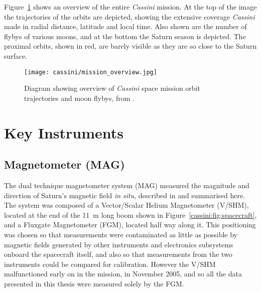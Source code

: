 Figure~\ref{cassini:fig:missionoverview} shows an overview of the entire \textit{Cassini} mission. At the top of the image the trajectories of the orbits are depicted, showing the extensive coverage \textit{Cassini} made in radial distance, latitude and local time. Also shown are the number of flybys of various moons, and  at the bottom the Saturn season is depicted. The proximal orbits, shown in red, are barely visible as they are so close to the Saturn surface.

\begin{figure}
\centering
\noindent\texttt{[image: cassini/mission\_overview.jpg]}
\caption[Diagram showing overview of \textit{Cassini }space mission.]{Diagram showing overview of \textit{Cassini} space mission orbit trajectories and moon flybys, from \citet{nasa2017}.}
\label{cassini:fig:missionoverview}
\end{figure}

\section{Key Instruments}
\subsection{Magnetometer (MAG)}
The dual technique magnetometer system (MAG) measured the magnitude and direction of Saturn's magnetic field \textit{in situ}, described in \citet{dougherty2004} and summarised here. The system was composed of a Vector/Scalar Helium Magnetometer (V/SHM), located at the end of the \SI{11}{m} long boom shown in Figure~\ref{cassini:fig:spacecraft}, and a Fluxgate Magnetometer (FGM), located half way along it. This positioning was chosen so that measurements were contaminated as little as possible by magnetic fields generated by other instruments and electronics subsystems onboard the spacecraft itself, and also so that measurements from the two instruments could be compared for calibration. However the V/SHM malfunctioned early on in the mission, in November 2005, and so all the data presented in this thesis were measured solely by the FGM.

